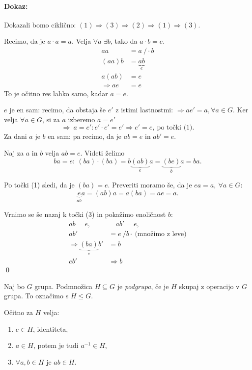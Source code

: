 \paragraph{Dokaz:}

Dokazali bomo cikli\v cno: $(1) \Rightarrow (3) \Rightarrow (2) \Rightarrow (1) \Rightarrow (3)$.

 Recimo, da je $a\cdot a = a$. Velja $\forall a$ $\exists b$, tako da $a\cdot b = e$.
\begin{align*}
	aa &= a\ / \cdot b \\
	(aa) b &= \underbrace{ab}_e \\
	a (ab) &= e \\
	\Rightarrow ae &= e
\end{align*}
To je o\v citno res lahko samo, kadar $a = e$.

 $e$ je en sam: recimo, da obstaja \v se $e'$ z istimi lastnostmi: $\Rightarrow a e' = a, \forall a\in G$.
Ker velja $\forall a \in G$, si za $a$ izberemo $a = e'$
\[
\Rightarrow\ a = e': e'\cdot e' = e' \Rightarrow e' = e,\ \text{po to\v cki (1).}
\]
Za dani $a$ je $b$ en sam: pa recimo, da je $ab = e$ in $ab' = e$.

 Naj za $a$ in $b$ velja $ab = e$. Videti \v zelimo
\[
ba = e:\ (ba)\cdot (ba) = b \underbrace{(ab)}_e a = \underbrace{(be)}_b a =b a.
\]

Po to\v cki (1) sledi, da je $(ba) = e$. Preveriti moramo \v se, da je $ea = a,\ \forall a\in G$:
\[
	\underbrace{e}_{ab} a = (ab)a= a(ba) = ae = a.
\] 

 Vrnimo se \v se nazaj k to\v cki (3) in poka\v zimo enoli\v cnost $b$:
\begin{align*}
	ab = e, &\quad ab' = e,\\
	ab' &= e\ / b\cdot\ \text{(mno\v zimo z leve)}\\
	\Rightarrow \underbrace{(ba)}_e b' &= b\\
	eb' &\Rightarrow b
\end{align*}
\qed

\begin{defin}
	Naj bo $G$ grupa. Podmno\v zica $H \subseteq G$ je \emph{podgrupa}, \v ce je $H$ skupaj z operacijo v $G$
	grupa. To ozna\v cimo s $H \leq G$.
\end{defin}

O\v citno za $H$ velja:

\begin{enumerate}
	\item{$e \in H$, identiteta,}
	\item{$a \in H$, potem je tudi $a^{-1} \in H$,}
	\item{$\forall a,b \in H$ je $ab \in H$.}
\end{enumerate}

